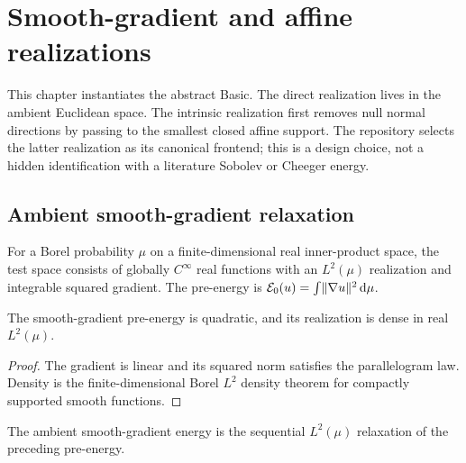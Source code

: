 \chapter{Smooth-gradient and affine realizations}
\label{chap:smooth-affine}

This chapter instantiates the abstract Basic.  The direct realization lives in the ambient
Euclidean space.  The intrinsic realization first removes null normal directions by passing to
the smallest closed affine support.  The repository selects the latter realization as its
canonical frontend; this is a design choice, not a hidden identification with a literature
Sobolev or Cheeger energy.

\section{Ambient smooth-gradient relaxation}

\begin{definition}
  \label{def:smooth-gradient-preenergy}
  \leanok
  For a Borel probability $\mu$ on a finite-dimensional real inner-product space, the test space
  consists of globally $C^\infty$ real functions with an $L^2(\mu)$ realization and integrable
  squared gradient.  The pre-energy is
  $\mathcal E_0(u)=\int\lVert\nabla u\rVert^2\,\mathrm d\mu$.
\end{definition}

\begin{theorem}
  \label{thm:smooth-gradient-quadratic-dense}
  \leanok
  The smooth-gradient pre-energy is quadratic, and its realization is dense in real $L^2(\mu)$.
\end{theorem}
\begin{proof}
  \leanok
  The gradient is linear and its squared norm satisfies the parallelogram law.  Density is the
  finite-dimensional Borel $L^2$ density theorem for compactly supported smooth functions.
\end{proof}

\begin{definition}
  \label{def:smooth-gradient-relaxation}
  \leanok
  The ambient smooth-gradient energy is the sequential $L^2(\mu)$ relaxation of the preceding
  pre-energy.
\end{definition}

